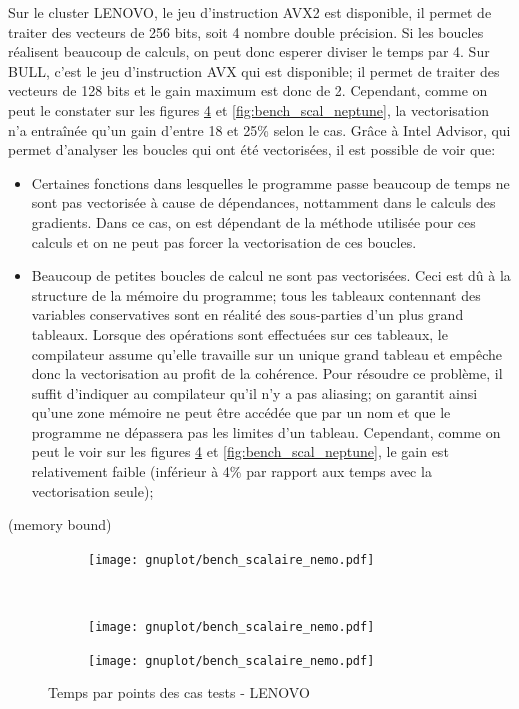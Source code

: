 Sur le cluster LENOVO, le jeu d'instruction AVX2 est disponible, il permet de traiter des vecteurs de 256 bits, soit 4 nombre double précision. Si les boucles réalisent beaucoup de calculs, on peut donc esperer diviser le temps par 4. Sur BULL, c'est le jeu d'instruction AVX qui est disponible; il permet de traiter des vecteurs de 128 bits et le gain maximum est donc de 2. Cependant, comme on peut le constater sur les figures \ref{fig:bench_scal_nemo} et \ref{fig:bench_scal_neptune}, la vectorisation n'a entraînée qu'un gain d'entre 18 et 25\% selon le cas. Grâce à Intel Advisor, qui permet d'analyser les boucles qui ont été vectorisées, il est possible de voir que:
\begin{itemize}
\item Certaines fonctions dans lesquelles le programme passe beaucoup de temps ne sont pas vectorisée à cause de dépendances, nottamment dans le calculs des gradients. Dans ce cas, on est dépendant de la méthode utilisée pour ces calculs et on ne peut pas forcer la vectorisation de ces boucles.
\item Beaucoup de petites boucles de calcul ne sont pas vectorisées. Ceci est dû à la structure de la mémoire du programme; tous les tableaux contennant des variables conservatives sont en réalité des sous-parties d'un plus grand tableaux. Lorsque des opérations sont effectuées sur ces tableaux, le compilateur assume qu'elle travaille sur un unique grand tableau et empêche donc la vectorisation au profit de la cohérence. Pour résoudre ce problème, il suffit d'indiquer au compilateur qu'il n'y a pas aliasing; on garantit ainsi qu'une zone mémoire ne peut être accédée que par un nom et que le programme ne dépassera pas les limites d'un tableau. Cependant, comme on peut le voir sur les figures \ref{fig:bench_scal_nemo} et \ref{fig:bench_scal_neptune}, le gain est relativement faible (inférieur à 4\% par rapport aux temps avec la vectorisation seule); 
\end{itemize}



(memory bound)



\begin{figure}[!ht]
  \centering
  \begin{subfigure}[b]{0.5\textwidth}
    \centering
    \texttt{[image: gnuplot/bench\_scalaire\_nemo.pdf]}
  \caption{\label{fig:bench_scal_nemo_nonper}}
  \end{subfigure}%
  ~
  \begin{subfigure}[b]{0.5\textwidth}
    \centering
    \texttt{[image: gnuplot/bench\_scalaire\_nemo.pdf]}
  \caption{\label{fig:bench_scal_nemo_sym}}
  \end{subfigure}
  \begin{subfigure}[b]{0.5\textwidth}
    \centering
    \texttt{[image: gnuplot/bench\_scalaire\_nemo.pdf]}
  \caption{\label{fig:bench_scal_nemo_per}}
  \end{subfigure}
  \caption{\label{fig:bench_scal_nemo}Temps par points des cas tests - LENOVO}
\end{figure}


